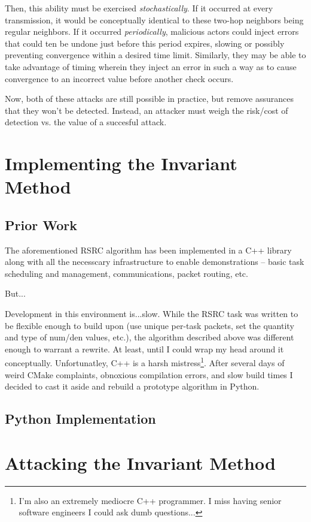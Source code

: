 \documentclass[11pt]{article}
\begin{document}
Then, this ability must be exercised \textit{stochastically}. If it occurred at
every transmission, it would be conceptually identical to these two-hop
neighbors being regular neighbors. If it occurred \textit{periodically}, malicious
actors could inject errors that could ten be undone just before this period expires,
slowing or possibly preventing convergence within a desired time limit. Similarly, they may
be able to take advantage of timing wherein they inject an error in such a way as to
cause convergence to an incorrect value before another check occurs.

Now, both of these attacks are still possible in practice, but remove assurances
that they won't be detected. Instead, an attacker must weigh the risk/cost of
detection vs. the value of a succesful attack.



\section{Implementing the Invariant Method}
\subsection*{Prior Work}
The aforementioned RSRC algorithm has been implemented in a C++ library along with all the necesscary
infrastructure to enable demonstrations -- basic task scheduling and management,
communications, packet routing, etc.

\medskip
\noindent
But...

\medskip
\noindent
\noindent
Development in this environment is...slow. While the RSRC task was written to be flexible enough to
build upon (use unique per-task packets, set the quantity and type of num/den
values, etc.), the algorithm described above was different enough to warrant a
rewrite. At least, until I could wrap my head around it conceptually.
Unfortunatley, C++ is a harsh mistress\footnote{I'm also an extremely mediocre
    C++ programmer. I miss having senior software engineers I could ask dumb
    questions...}. After several days of weird CMake complaints, obnoxious
compilation errors, and slow build times I decided to cast it aside and rebuild
a prototype algorithm in Python.

\subsection*{Python Implementation}


\section{Attacking the Invariant Method}
\end{document}
